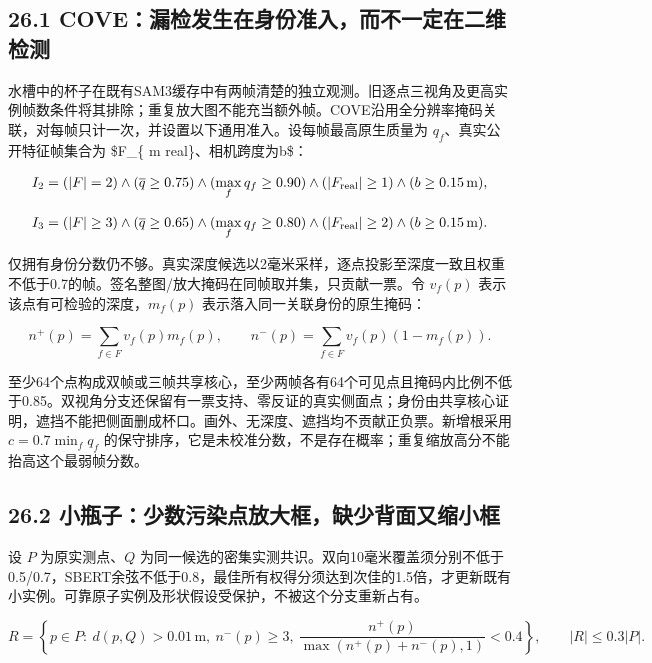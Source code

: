 \documentclass[UTF8,fontset=fandol]{ctexart}
\begin{document}
\subsection*{26.1 COVE：漏检发生在身份准入，而不一定在二维检测}

水槽中的杯子在既有SAM3缓存中有两帧清楚的独立观测。旧逐点三视角及更高实例帧数条件将其排除；重复放大图不能充当额外帧。COVE沿用全分辨率掩码关联，对每帧只计一次，并设置以下通用准入。设每帧最高原生质量为 $q_f$、真实公开特征帧集合为 \$F\_\{
m real\}$、相机跨度为$b\$：



\[
I_2=(|F|=2)\land(\overline q\ge0.75)\land(\max_f q_f\ge0.90)\land(|F_{\rm real}|\ge1)\land(b\ge0.15\,\mathrm m),
\]

\[
I_3=(|F|\ge3)\land(\overline q\ge0.65)\land(\max_f q_f\ge0.80)\land(|F_{\rm real}|\ge2)\land(b\ge0.15\,\mathrm m).
\]

仅拥有身份分数仍不够。真实深度候选以2毫米采样，逐点投影至深度一致且权重不低于0.7的帧。签名整图/放大掩码在同帧取并集，只贡献一票。令 $v_f(p)$ 表示该点有可检验的深度，$m_f(p)$ 表示落入同一关联身份的原生掩码：



\[
n^+(p)=\sum_{f\in F}v_f(p)m_f(p),\qquad n^-(p)=\sum_{f\in F}v_f(p)(1-m_f(p)).
\]

至少64个点构成双帧或三帧共享核心，至少两帧各有64个可见点且掩码内比例不低于0.85。双视角分支还保留有一票支持、零反证的真实侧面点；身份由共享核心证明，遮挡不能把侧面删成杯口。画外、无深度、遮挡均不贡献正负票。新增根采用 $c=0.7\min_fq_f$ 的保守排序，它是未校准分数，不是存在概率；重复缩放高分不能抬高这个最弱帧分数。



\subsection*{26.2 小瓶子：少数污染点放大框，缺少背面又缩小框}

设 $P$ 为原实测点、$Q$ 为同一候选的密集实测共识。双向10毫米覆盖须分别不低于0.5/0.7，SBERT余弦不低于0.8，最佳所有权得分须达到次佳的1.5倍，才更新既有小实例。可靠原子实例及形状假设受保护，不被这个分支重新占有。



\[
R=\left\{p\in P:\ d(p,Q)>0.01\,\mathrm m,\ n^-(p)\ge3,\ \frac{n^+(p)}{\max(n^+(p)+n^-(p),1)}<0.4\right\},\qquad |R|\le0.3|P|.
\]
\end{document}
